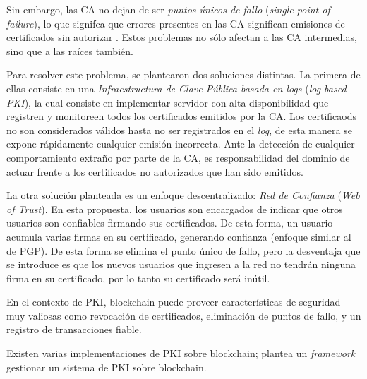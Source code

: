 Sin embargo, las CA no dejan de ser \emph{puntos únicos de fallo} (\emph{single point of failure}), lo que signifca que errores presentes en las CA significan emisiones de certificados sin autorizar \autocite{PKICAErrors}. Estos problemas no sólo afectan a las CA intermedias, sino que a las raíces también.

Para resolver este problema, se plantearon dos soluciones distintas. La primera de ellas consiste en una \emph{Infraestructura de Clave Pública basada en logs} (\emph{log-based PKI}), la cual consiste en implementar servidor con alta disponibilidad que registren y monitoreen todos los certificados emitidos por la CA. Los certificaods no son considerados válidos hasta no ser registrados en el \emph{log}, de esta manera se expone rápidamente cualquier emisión incorrecta. Ante la detección de cualquier comportamiento extraño por parte de la CA, es responsabilidad del dominio de actuar frente a los certificados no autorizados que han sido emitidos.

La otra solución planteada es un enfoque descentralizado: \emph{Red de Confianza} (\emph{Web of Trust}). En esta propuesta, los usuarios son encargados de indicar que otros usuarios son confiables firmando sus certificados. De esta forma, un usuario acumula varias firmas en su certificado, generando confianza (enfoque similar al de PGP). De esta forma se elimina el punto único de fallo, pero la desventaja que se introduce es que los nuevos usuarios que ingresen a la red no tendrán ninguna firma en su certificado, por lo tanto su certificado será inútil.

En el contexto de PKI, blockchain puede proveer características de seguridad muy valiosas como revocación de certificados, eliminación de puntos de fallo, y un registro de transacciones fiable.

Existen varias implementaciones de PKI sobre blockchain; \autocite{BlockchainBasedPKIFramework} plantea un \emph{framework} gestionar un sistema de PKI sobre blockchain. 



\clearpage
\printbibliography


